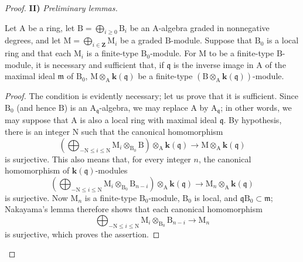 \begin{proof}
\medskip
\noindent\textbf{II)} \emph{Preliminary lemmas.}

\begin{lemma}[11.2.9.3]
\label{IV.11.2.9.3}
Let $\mathrm{A}$ be a ring, let
$\mathrm{B}=\bigoplus_{i\geqslant 0}\mathrm{B}_i$ be an
$\mathrm{A}$-algebra graded in nonnegative degrees, and let
$\mathrm{M}=\bigoplus_{i\in\mathbf{Z}}\mathrm{M}_i$ be a graded
$\mathrm{B}$-module. Suppose that $\mathrm{B}_0$ is a local ring and
that each $\mathrm{M}_i$ is a finite-type $\mathrm{B}_0$-module. For
$\mathrm{M}$ to be a finite-type $\mathrm{B}$-module, it is necessary
and sufficient that, if $\mathfrak{q}$ is the inverse image in
$\mathrm{A}$ of the maximal ideal $\mathfrak{m}$ of $\mathrm{B}_0$,
$\mathrm{M}\otimes_\mathrm{A}\boldsymbol{k}(\mathfrak{q})$ be a
finite-type
$(\mathrm{B}\otimes_\mathrm{A}\boldsymbol{k}(\mathfrak{q}))$-module.
\end{lemma}


\begin{proof}
The condition is evidently necessary; let us prove that it is
sufficient. Since $\mathrm{B}_0$ (and hence $\mathrm{B}$) is an
$\mathrm{A}_{\mathfrak{q}}$-algebra, we may replace $\mathrm{A}$ by
$\mathrm{A}_{\mathfrak{q}}$; in other words, we may suppose that
$\mathrm{A}$ is also a local ring with maximal ideal
$\mathfrak{q}$. By hypothesis, there is an integer $\mathrm{N}$ such
that the canonical homomorphism
\[
 \left(\bigoplus_{-\mathrm{N}\leqslant i\leqslant\mathrm{N}}
   \mathrm{M}_i\otimes_{\mathrm{B}_0}\mathrm{B}\right)
   \otimes_\mathrm{A}\boldsymbol{k}(\mathfrak{q})
 \longrightarrow
 \mathrm{M}\otimes_\mathrm{A}\boldsymbol{k}(\mathfrak{q})
\]
is surjective. This also means that, for every integer $n$, the
canonical homomorphism of $\boldsymbol{k}(\mathfrak{q})$-modules
\[
 \left(\bigoplus_{-\mathrm{N}\leqslant i\leqslant\mathrm{N}}
   \mathrm{M}_i\otimes_{\mathrm{B}_0}\mathrm{B}_{n-i}\right)
   \otimes_\mathrm{A}\boldsymbol{k}(\mathfrak{q})
 \longrightarrow
 \mathrm{M}_n\otimes_\mathrm{A}\boldsymbol{k}(\mathfrak{q})
\]
is surjective. Now $\mathrm{M}_n$ is a finite-type
$\mathrm{B}_0$-module, $\mathrm{B}_0$ is local, and
$\mathfrak{q}\mathrm{B}_0\subset\mathfrak{m}$; Nakayama's lemma
therefore shows that each canonical homomorphism
\[
 \bigoplus_{-\mathrm{N}\leqslant i\leqslant\mathrm{N}}
   \mathrm{M}_i\otimes_{\mathrm{B}_0}\mathrm{B}_{n-i}
 \longrightarrow \mathrm{M}_n
\]
is surjective, which proves the assertion.
\end{proof}


\end{proof}
